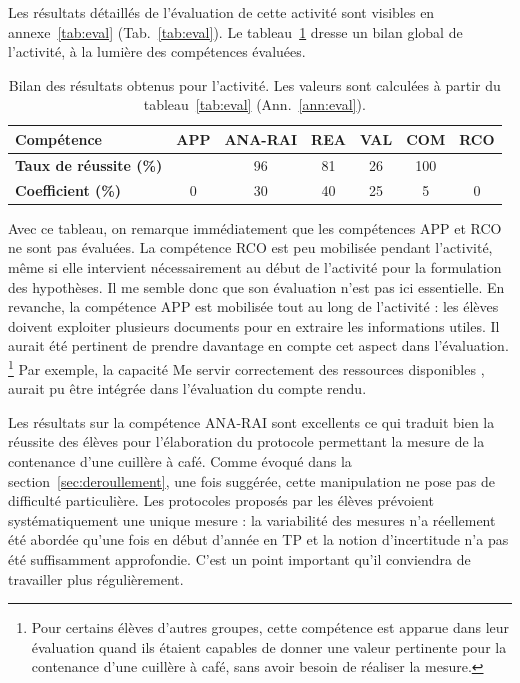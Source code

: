 \documentclass[12pt,a4paper, fleqn]{report}
\newcommand{\app}{\colorbox{bleu_c}{\textcolor{bleu_f}{APP}}}
\newcommand{\rea}{\colorbox{yellow_c}{\textcolor{yellow_f}{REA}}}
\newcommand{\anarai}{\colorbox{green_c}{\textcolor{green_f}{ANA-RAI}}}
\newcommand{\val}{\colorbox{orange_c}{\textcolor{orange_f}{VAL}}}
\newcommand{\com}{\colorbox{red_c}{\textcolor{red_f}{COM}}}
\newcommand{\rco}{\colorbox{gray_c}{\textcolor{gray_f}{RCO}}}
\begin{document}
Les résultats détaillés de l'évaluation de cette activité sont visibles en annexe~\ref{tab:eval} (Tab.~\ref{tab:eval}).
Le tableau~\ref{tab:bilan_cptces} dresse un bilan global de l'activité, à la lumière des compétences évaluées.

\begin{table}[htbp]
\center
\renewcommand\arraystretch{1.5}		%
\begin{tabular}{|l|c|c|c|c|c|c|}
\hline
\textbf{Compétence} 				& \app{} 	& \anarai{}	& \rea{}	& \val{}	& \com{}	& \rco{} 	\\
\hline
\textbf{Taux de réussite (\%)}	& 				&	96			&	81		&	26		& 	100		&				\\
\hline
\textbf{Coefficient (\%)	}			& 0			&	30			& 40		& 25		&	5			& 0			\\
\hline
\end{tabular}
\caption{Bilan des résultats obtenus pour l'activité.
Les valeurs  sont calculées à partir du tableau~\ref{tab:eval} (Ann.~\ref{ann:eval}).}
\label{tab:bilan_cptces}
\end{table}

Avec ce tableau, on remarque immédiatement que les compétences \app{} et \rco{} ne sont pas évaluées.
La compétence \rco{} est peu mobilisée pendant l'activité, même si elle intervient nécessairement au début de l'activité pour la formulation des hypothèses.
Il me semble donc que son évaluation n'est pas ici essentielle.
En revanche, la compétence \app{} est mobilisée tout au long de l'activité : les élèves doivent exploiter plusieurs documents pour en extraire les informations utiles.
Il aurait été pertinent de prendre davantage en compte cet aspect dans l'évaluation.
\footnote{Pour certains élèves d'autres groupes, cette compétence est apparue dans leur évaluation quand ils étaient capables de donner une valeur pertinente pour la contenance d'une cuillère à café, sans avoir besoin de réaliser la mesure.}
Par exemple, la capacité \og Me servir correctement des ressources disponibles \fg{}, aurait pu être intégrée dans l'évaluation du compte rendu.

Les résultats sur la compétence \anarai{} sont excellents ce qui traduit bien la réussite des élèves pour l'élaboration du protocole permettant la mesure de la contenance d'une cuillère à café.
Comme évoqué dans la section~\ref{sec:deroullement}, une fois suggérée, cette manipulation ne pose pas de difficulté particulière.
Les protocoles proposés par les élèves prévoient systématiquement une unique mesure : la variabilité des mesures n'a réellement été abordée qu'une fois en début d'année en TP et la notion d'incertitude n'a pas été suffisamment approfondie.
C'est un point important qu'il conviendra de travailler plus régulièrement.
\end{document}
